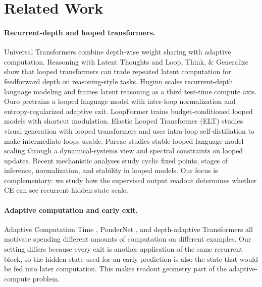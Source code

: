 \section{Related Work}
\label{sec:related}

\paragraph{Recurrent-depth and looped transformers.}
Universal Transformers \citep{dehghani2019universal} combine depth-wise weight sharing with adaptive computation.
Reasoning with Latent Thoughts \citep{saunshi2025latentthoughts} and Loop, Think, \& Generalize \citep{kohli2026loopthink} show that looped transformers can trade repeated latent computation for feedforward depth on reasoning-style tasks.
Huginn \citep{geiping2025huginn} scales recurrent-depth language modeling and frames latent reasoning as a third test-time compute axis.
Ouro \citep{zhu2025ouro} pretrains a looped language model with inter-loop normalization and entropy-regularized adaptive exit.
LoopFormer \citep{jeddi2026loopformer} trains budget-conditioned looped models with shortcut modulation.
Elastic Looped Transformer (ELT) \citep{goyal2026elt} studies visual generation with looped transformers and uses intra-loop self-distillation to make intermediate loops usable.
Parcae \citep{prairie2026parcae} studies stable looped language-model scaling through a dynamical-systems view and spectral constraints on looped updates.
Recent mechanistic analyses \citep{blayney2026mechanistic,labovich2026stability} study cyclic fixed points, stages of inference, normalization, and stability in looped models.
Our focus is complementary: we study how the supervised output readout determines whether CE can see recurrent hidden-state scale.

\paragraph{Adaptive computation and early exit.}
Adaptive Computation Time \citep{graves2016adaptive}, PonderNet \citep{banino2021pondernet}, and depth-adaptive Transformers \citep{elbayad2020depth} all motivate spending different amounts of computation on different examples.
Our setting differs because every exit is another application of the same recurrent block, so the hidden state used for an early prediction is also the state that would be fed into later computation.
This makes readout geometry part of the adaptive-compute problem.

